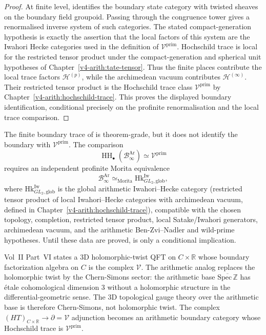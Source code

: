 \begin{proof}
At finite level,
 identifies the
boundary state category with twisted sheaves on the boundary field
groupoid. Passing through the congruence tower gives a renormalised
inverse system of such categories. The stated compact-generation
hypothesis is exactly the assertion that the local factors of this
system are the Iwahori Hecke categories used in the definition of
\(\mathcal V^{\mathrm{prim}}\). Hochschild trace is local for the
restricted tensor product under the compact-generation and spherical
unit hypotheses of Chapter~\ref{v4-arith:tate-tensor}. Thus the
finite places contribute the local trace factors
\(\mathcal H^{(p)}\), while the archimedean vacuum contributes
\(\mathcal H^{(\infty)}\). Their restricted tensor product is the
Hochschild trace class \(\mathcal V^{\mathrm{prim}}\) by
Chapter~\ref{v4-arith:hochschild-trace}. This proves the displayed
boundary identification, conditional precisely on the profinite
renormalisation and the local trace comparison.
\end{proof}

\begin{remark}
\label{v4-arith:3d-acs:rem:boundary-trace-form}
The finite boundary trace of
 is theorem-grade, but it
does not identify the boundary with
\(\mathcal V^{\mathrm{prim}}\). The comparison
\[
\operatorname{HH}_{\bullet}(\mathcal B_\infty^{\mathrm{Ar}})
\simeq \mathcal V^{\mathrm{prim}}
\]
requires an independent profinite Morita equivalence
\[
\mathcal B_\infty^{\mathrm{Ar}}
\simeq_{\mathrm{Morita}}
\mathrm{Hk}^{\mathrm{Iw}}_{GL_2,\mathrm{glob}},
\]
where \(\mathrm{Hk}^{\mathrm{Iw}}_{GL_2,\mathrm{glob}}\) is the global
arithmetic Iwahori--Hecke category (restricted tensor product of local
Iwahori--Hecke categories with archimedean vacuum, defined in
Chapter~\ref{v4-arith:hochschild-trace}),
compatible with the chosen topology, completion, restricted tensor
product, local Satake/Iwahori generators, archimedean vacuum, and the
arithmetic Ben-Zvi--Nadler and wild-prime hypotheses. Until these data
are proved,  is only a
conditional implication.
\end{remark}

\begin{remark}
\label{v4-arith:3d-acs:rem:vol2-bridge}
Vol~II Part~VI states a 3D holomorphic-twist QFT on \(C\times\mathbb{R}\)
whose boundary factorization algebra on \(C\) is the complex
\(\mathcal{V}\). The arithmetic analog replaces the holomorphic twist by
the Chern-Simons sector: the arithmetic base
\(\overline{\mathrm{Spec}\,\mathbb{Z}}\) has étale cohomological dimension
\(3\) without a holomorphic structure in the differential-geometric sense.
The 3D topological gauge theory over the arithmetic base is therefore
Chern-Simons, not holomorphic twist. The complex
\((HT)_{C\times\mathbb{R}}\to\partial=\mathcal{V}\) adjunction becomes
an arithmetic boundary category whose Hochschild trace is
\(\mathcal{V}^{\mathrm{prim}}\).
\end{remark}

